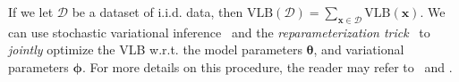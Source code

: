 If we let $\mathcal{D}$ be a dataset of i.i.d. data, then $\mathrm{VLB}(\mathcal{D}) = \sum_{\mathbf{x} \in \mathcal{D}}\mathrm{VLB}(\mathbf{x})$. We can use stochastic variational inference~\citep{hoffman2013stochastic} and the \textit{reparameterization trick}~\citep{kingma2013auto,rezende2014stochastic} to \textit{jointly} optimize the VLB w.r.t. the model parameters $\boldsymbol{\theta}$, and variational parameters $\boldsymbol{\phi}$. For more details on this procedure, the reader may refer to~\cite{kingma2019introduction} and \cite{blei2017variational}.
%

